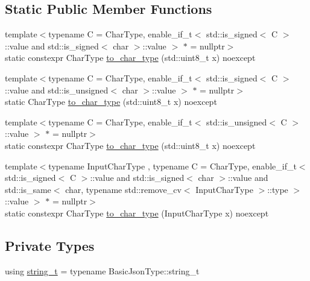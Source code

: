 \subsection*{Static Public Member Functions}
\begin{DoxyCompactItemize}
\item 
{\footnotesize template$<$typename C  = Char\+Type, enable\+\_\+if\+\_\+t$<$ std\+::is\+\_\+signed$<$ C $>$\+::value and std\+::is\+\_\+signed$<$ char $>$\+::value $>$ $\ast$  = nullptr$>$ }\\static constexpr Char\+Type \mbox{\hyperlink{classnlohmann_1_1detail_1_1binary__writer_ab77aa48692bd4e64e4f051ce6aeb6d2d}{to\+\_\+char\+\_\+type}} (std\+::uint8\+\_\+t x) noexcept
\item 
{\footnotesize template$<$typename C  = Char\+Type, enable\+\_\+if\+\_\+t$<$ std\+::is\+\_\+signed$<$ C $>$\+::value and std\+::is\+\_\+unsigned$<$ char $>$\+::value $>$ $\ast$  = nullptr$>$ }\\static Char\+Type \mbox{\hyperlink{classnlohmann_1_1detail_1_1binary__writer_a5e46f0dd3550901b15cf85265808d1ec}{to\+\_\+char\+\_\+type}} (std\+::uint8\+\_\+t x) noexcept
\item 
{\footnotesize template$<$typename C  = Char\+Type, enable\+\_\+if\+\_\+t$<$ std\+::is\+\_\+unsigned$<$ C $>$\+::value $>$ $\ast$  = nullptr$>$ }\\static constexpr Char\+Type \mbox{\hyperlink{classnlohmann_1_1detail_1_1binary__writer_ab77aa48692bd4e64e4f051ce6aeb6d2d}{to\+\_\+char\+\_\+type}} (std\+::uint8\+\_\+t x) noexcept
\item 
{\footnotesize template$<$typename Input\+Char\+Type , typename C  = Char\+Type, enable\+\_\+if\+\_\+t$<$ std\+::is\+\_\+signed$<$ C $>$\+::value and std\+::is\+\_\+signed$<$ char $>$\+::value and std\+::is\+\_\+same$<$ char, typename std\+::remove\+\_\+cv$<$ Input\+Char\+Type $>$\+::type $>$\+::value $>$ $\ast$  = nullptr$>$ }\\static constexpr Char\+Type \mbox{\hyperlink{classnlohmann_1_1detail_1_1binary__writer_a2c2b2132ce56b3b45593374b622baa67}{to\+\_\+char\+\_\+type}} (Input\+Char\+Type x) noexcept
\end{DoxyCompactItemize}
\subsection*{Private Types}
\begin{DoxyCompactItemize}
\item 
using \mbox{\hyperlink{classnlohmann_1_1detail_1_1binary__writer_a29f2ae7a5c4a8c1dae47b3b2310de8a8}{string\+\_\+t}} = typename Basic\+Json\+Type\+::string\+\_\+t
\end{DoxyCompactItemize}
